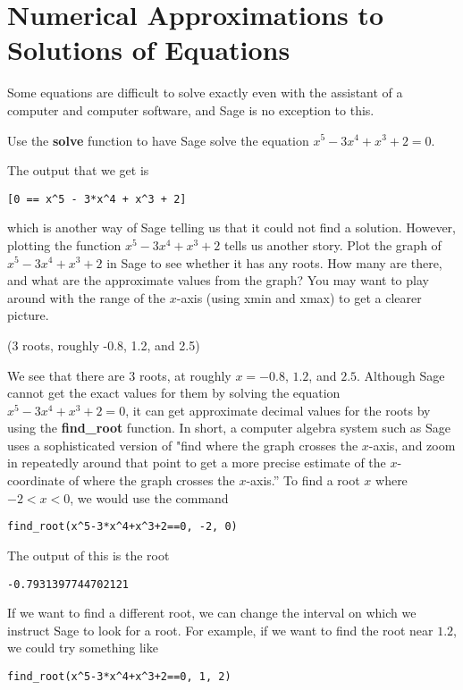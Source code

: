 \section{Numerical Approximations to Solutions of Equations}

Some equations are difficult to solve exactly even with the
assistant of a computer and computer software, and Sage is no
exception to this. 

Use the \textbf{solve} function to have Sage solve the
equation $x^5-3x^4+x^3+2=0$. 

The output that we get is
\begin{verbatim}
[0 == x^5 - 3*x^4 + x^3 + 2]
\end{verbatim}

which is another way of Sage telling us that it could not find a solution.
However, plotting the function $x^5-3x^4+x^3+2$ tells us another story.
Plot the graph of $x^5-3x^4+x^3+2$ in Sage to see whether it has
any roots. How many are there, and what are the approximate values
from the graph? You may want to play around with the range of the
$x$-axis (using xmin and xmax) to get a clearer picture.

(3 roots, roughly -0.8, 1.2, and 2.5)

We see that there are 3 roots, at roughly $x=-0.8$, $1.2$, and $2.5$.
Although Sage cannot get the exact values for them by solving
the equation $x^5-3x^4+x^3+2=0$, it can get approximate decimal
values for the roots by using the \textbf{find\_root} function. In
short, a computer algebra system such as Sage uses a sophisticated
version of "find where the graph crosses the $x$-axis, and zoom in
repeatedly around that point to get a more precise estimate of the
$x$-coordinate of where the graph crosses the $x$-axis.'' To find
a root $x$ where $-2<x<0$, we would use the command

\begin{verbatim}
find_root(x^5-3*x^4+x^3+2==0, -2, 0)
\end{verbatim}

The output of this is the root

\begin{verbatim}
-0.7931397744702121
\end{verbatim}

If we want to find a different root, we can change the interval on
which we instruct Sage to look for a root. For example, if we want
to find the root near $1.2$, we could try something like

\begin{verbatim}
find_root(x^5-3*x^4+x^3+2==0, 1, 2)
\end{verbatim}

